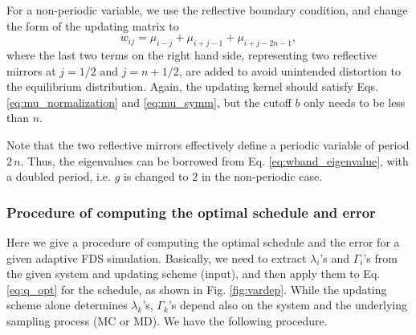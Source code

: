 \documentclass[reprint, superscriptaddress, floatfix]{revtex4-1}
\begin{document}
For a non-periodic variable,
we use the reflective boundary condition\cite{bussi2006},
and change the form of the updating matrix to
%
%
\begin{equation}
  w_{ij}
  =
  \mu_{ i - j }
  +
  \mu_{ i + j - 1 }
  +
  \mu_{ i + j - 2 n - 1 }
  ,
  \label{eq:w_band_refl}
\end{equation}
%
where the last two terms on the right hand side,
representing two reflective mirrors at
$j = 1/2$ and $j = n + 1/2$,
are added to avoid unintended distortion\cite{dickson2011, mcgovern2013}
to the equilibrium distribution\cite{bussi2006}.
%
Again, the updating kernel should satisfy
Eqs. \eqref{eq:mu_normalization}
and \eqref{eq:mu_symm},
but
the cutoff $b$ only needs to be less than $n$.

Note that the two reflective mirrors effectively
define a periodic variable of period $2 \, n$.
Thus, the eigenvalues can be borrowed from
Eq. \eqref{eq:wband_eigenvalue},
with a doubled period,
i.e. $g$ is changed to $2$ in the non-periodic case.




\subsubsection{\label{sec:procedure}
Procedure of computing the optimal schedule and error
}


Here we give a procedure of computing
the optimal schedule and the error
for a given adaptive FDS simulation.
%
Basically, we need to extract
$\lambda_i$'s and $\Gamma_i$'s
from the given system and updating scheme (input),
and then apply them to Eq. \eqref{eq:q_opt}
for the schedule,
as shown in Fig. \ref{fig:vardep}.
%
%
While the updating scheme alone
determines $\lambda_k$'s,
$\Gamma_k$'s depend also on the system
and the underlying sampling process (MC or MD).
%
We have the following procedure.
\end{document}
